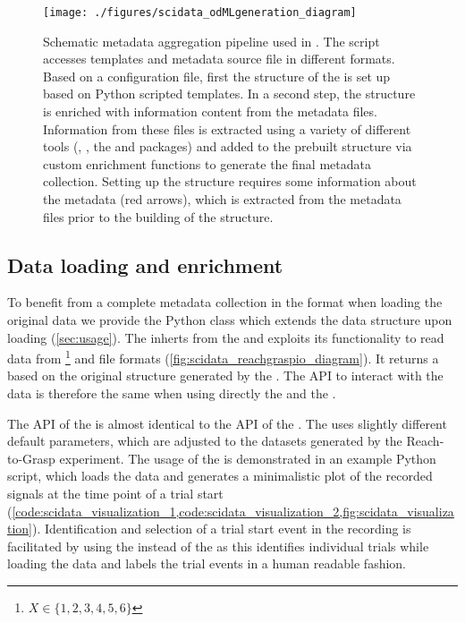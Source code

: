 \begin{figure}
 \texttt{[image: ./figures/scidata\_odMLgeneration\_diagram]}
 \caption[Schematic metadata aggregation pipeline used in \citet{Brochier_2018}]{Schematic metadata aggregation pipeline used in \citet{Brochier_2018}. The  script accesses  templates and metadata source file in different formats. Based on a configuration file, first the structure of the  is set up based on Python scripted  templates. In a second step, the structure is enriched with information content from the metadata files. Information from these files is extracted using a variety of different tools (, , the   and  packages) and added to the prebuilt  structure via custom enrichment functions to generate the final metadata collection. Setting up the  structure requires some information about the metadata (red arrows), which is extracted from the metadata files prior to the building of the  structure.}
 \label{fig:scidata_metadata_pipeline}
\end{figure}

\subsection{Data loading and enrichment}
To benefit from a complete metadata collection in the  format when loading the original data we provide the  Python class which extends the  data structure upon loading (\cref{sec:usage}). The  inherts from the   and exploits its functionality to read data from \footnote{$X \in \{1,2,3,4,5,6\}$} and  file formats (\cref{fig:scidata_reachgraspio_diagram}). It returns a   based on the original structure generated by the  . The API to interact with the data is therefore the same when using directly the   and the .

The API of the  is almost identical to the API of the . The  uses slightly different default parameters, which are adjusted to the datasets generated by the Reach-to-Grasp experiment. The usage of the  is demonstrated in an example Python script, which loads the data and generates a minimalistic plot of the recorded signals at the time point of a trial start (\cref{code:scidata_visualization_1,code:scidata_visualization_2,fig:scidata_visualization}).
Identification and selection of a trial start event in the recording is facilitated by using the  instead of the  as this identifies individual trials while loading the data and labels the trial events in a human readable fashion.


